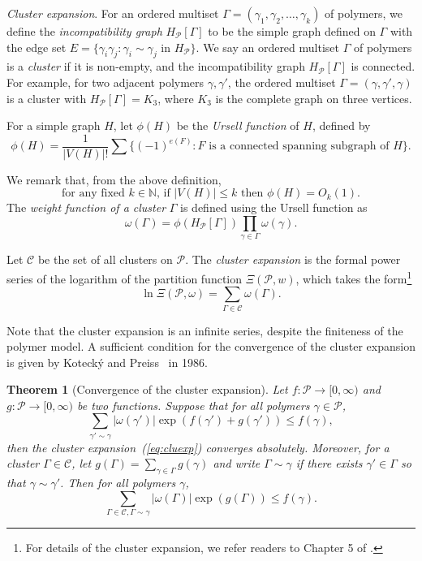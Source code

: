 \documentclass{amsart}
\newtheorem{thm}{Theorem}[section]
\theoremstyle{definition}
\newcommand{\we}{\omega}
\newcommand{\NN}{\mathbb{N}}
\newcommand{\cC}{\mathcal{C} }
\newcommand{\cP}{\mathcal{P} }
\newcommand{\beq}[1]{\begin{equation}\label{#1}}
\newcommand{\enq}[0]{\end{equation}}
\newcommand{\nin}[0]{\noindent}
\newcommand{\0}[0]{\emptyset}
\begin{document}
\nin \textit{Cluster expansion}. 
For an ordered multiset $\Gamma=(\gamma_1, \gamma_2, \ldots, \gamma_k)$ of polymers,
we define the \textit{incompatibility graph} $H_{\cP}[\Gamma]$ to be the simple graph defined on $\Gamma$ with the edge set $E=\{\gamma_i\gamma_j: \gamma_i\sim \gamma_j \text{ in } H_{\cP}\}$.
We say an ordered multiset $\Gamma$ of polymers is a \textit{cluster} if it is non-empty, and the incompatibility graph $H_{\cP}[\Gamma]$ is connected.
For example, for two adjacent polymers $\gamma, \gamma'$, the ordered multiset $\Gamma=(\gamma, \gamma', \gamma)$ is a cluster with $H_{\cP}[\Gamma]=K_3$, where $K_3$ is the complete graph on three vertices.

For a simple graph $H$, let $\phi(H)$ be the \textit{Ursell function} of $H$, defined by
\[
\phi(H)=\frac{1}{|V(H)|!}\sum \{(-1)^{e(F)}: \mbox{$F$ is a connected spanning subgraph of $H$}\}.\]

We remark that, from the above definition,
\beq{ursell} \mbox{for any fixed $k \in \NN$, if $|V(H)|\le k$ then $\phi(H)=O_k(1)$.}\enq
The \textit{weight function of a cluster} $\Gamma$ is defined using the Ursell function as
\begin{equation}\label{def:cluweight}
   \we(\Gamma)=\phi(H_{\cP}[\Gamma])\prod_{\gamma\in \Gamma}\we(\gamma).
\end{equation}

Let $\mathcal{C}$ be the set of all clusters on $\cP$. The \textit{cluster expansion} is the formal power series of the logarithm
of the partition function $\Xi(\cP, w)$, which takes the form\footnote{For details of the cluster expansion, we refer  readers to Chapter 5 of \cite{friedli2017statistical}.}
\begin{equation}\label{eq:cluexp}
 \ln\Xi(\cP, \we) = \sum_{\Gamma\in\mathcal{C}}\we(\Gamma). 
\end{equation}

Note that the cluster expansion is an infinite series, despite the finiteness of the polymer model.
A sufficient condition for the convergence of the cluster expansion is given by Koteck\'{y} and Preiss~\cite{kotecky1986cluster} in 1986.

\begin{thm}[Convergence of the cluster expansion]\label{KPconv}
Let $f: \cP \rightarrow [0, \infty)$ and $g: \cP \rightarrow [0, \infty)$ be two functions. Suppose that for all polymers $\gamma\in\cP$,
\begin{equation}\label{eq:kot-thm1}
\sum_{\gamma'\sim \gamma}|\we(\gamma')|\exp\left(f(\gamma')+g(\gamma')\right)\leq f(\gamma),
\end{equation}
then the cluster expansion~(\ref{eq:cluexp}) converges absolutely. 
Moreover, for a cluster $\Gamma\in \cC$, let $g(\Gamma)=\sum_{\gamma\in\Gamma}g(\gamma)$ and write $\Gamma\sim \gamma$ if there exists $\gamma'\in \Gamma$ so that $\gamma\sim \gamma'$. Then for all polymers $\gamma$,
\begin{equation}\label{eq:kot-thm2}
\sum_{\Gamma\in \mathcal{C}, \Gamma\sim \gamma}|\we(\Gamma)|\exp\left(g(\Gamma)\right)\leq f(\gamma).
\end{equation}
\end{thm}
\end{document}
